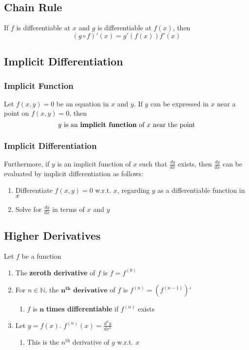 \documentclass[../ma2002_notes.tex]{subfiles}
\begin{document}
\subsection{Chain Rule}
If \(f\) is differentiable at \(x\) and \(g\) is differentiable at \(f(x)\), then
\[(g\circ f)'(x)=g'(f(x))f'(x)\]

\subsection{Implicit Differentiation}
\subsubsection{Implicit Function}
Let \(f(x,y)=0\) be an equation in \(x\) and \(y\). If \(y\) can be expressed in \(x\) near a point on \(f(x,y)=0\), then
\[y\text{ is an \textbf{implicit function} of }x\text{ near the point}\]

\subsubsection{Implicit Differentiation}
Furthermore, if \(y\) is an implicit function of \(x\) such that \(\frac{dy}{dx}\) exists, then \(\frac{dy}{dx}\) can be evaluated by implicit differentiation as follows:
\begin{enumerate}
	\item Differentiate \(f(x,y)=0\) w.r.t. \(x\), regarding \(y\) as a differentiable function in \(x\)
	\item Solve for \(\frac{dy}{dx}\) in terms of \(x\) and \(y\)
\end{enumerate}

\subsection{Higher Derivatives}
Let \(f\) be a function
\begin{enumerate}
	\item The \textbf{zeroth derivative} of \(f\) is \(f=f^{(0)}\)
	\item For \(n\in\mathbb{N}\), the \(\pmb{n^{th}}\textbf{ derivative}\) of \(f\) is \(f^{(n)}=(f^{(n-1)})'\)
	\begin{enumerate}
		\item \(f\) is \(\pmb{n}\)\textbf{ times differentiable} if \(f^{(n)}\) exists
	\end{enumerate}
	\item Let \(y=f(x)\). \(f^{(n)}(x)=\frac{d^ny}{dx^n}\)
	\begin{enumerate}
		\item This is the \(n^{\text{th}}\) derivative of \(y\) w.r.t. \(x\)
	\end{enumerate}
\end{enumerate}
\end{document}
